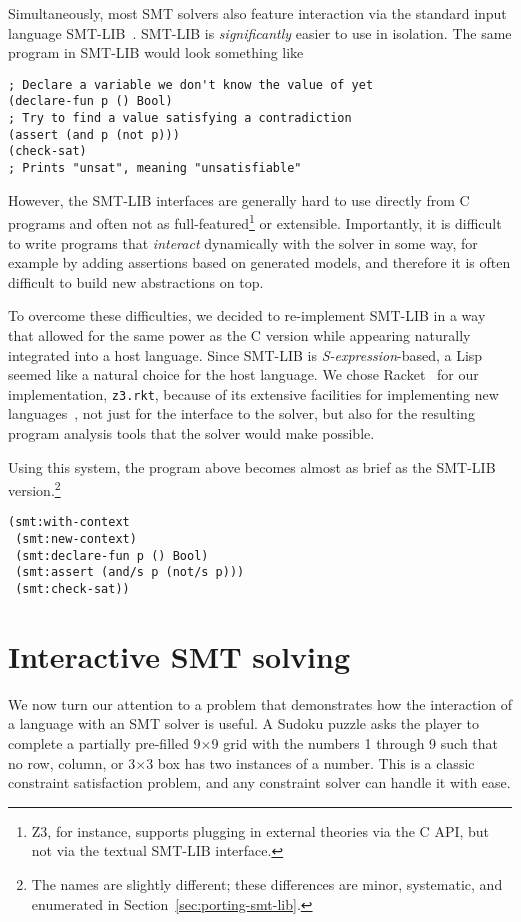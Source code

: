Simultaneously, most SMT solvers also feature interaction via the standard input
language SMT-LIB~\cite{smtlib2:10}. SMT-LIB is \textit{significantly} easier to
use in isolation. The same program in SMT-LIB would look something like

\begin{verbatim}
; Declare a variable we don't know the value of yet
(declare-fun p () Bool)
; Try to find a value satisfying a contradiction
(assert (and p (not p)))
(check-sat)
; Prints "unsat", meaning "unsatisfiable"
\end{verbatim}

However, the SMT-LIB interfaces are generally hard to use directly from C
programs and often not as full-featured\footnote{Z3, for instance, supports
  plugging in external theories via the C API, but not via the textual SMT-LIB
  interface.}  or extensible. Importantly, it is difficult to write programs
that \textit{interact} dynamically with the solver in some way, for example by
adding assertions based on generated models, and therefore it is often difficult
to build new abstractions on top.

To overcome these difficulties, we decided to re-implement SMT-LIB in a way
that allowed for the same power as the C version while appearing naturally
integrated into a host language. Since SMT-LIB is {\em S-expression}-based, a
Lisp seemed like a natural choice for the host language. We chose
Racket~\cite{racket} for our implementation, \texttt{z3.rkt}, because of its
extensive facilities for implementing new languages~\cite{Tobin-Hochstadt:11},
not just for the interface to the solver, but also for the resulting program
analysis tools that the solver would make possible.

Using this system, the program above becomes almost as brief as the SMT-LIB
version.\footnote{The names are slightly different; these differences are
minor, systematic, and enumerated in Section~\ref{sec:porting-smt-lib}.}

\begin{verbatim}
(smt:with-context
 (smt:new-context)
 (smt:declare-fun p () Bool)
 (smt:assert (and/s p (not/s p)))
 (smt:check-sat))
\end{verbatim}

\section{Interactive SMT solving}

We now turn our attention to a problem that demonstrates how the interaction of
a language with an SMT solver is useful. A Sudoku puzzle asks the player to
complete a partially pre-filled 9$\times$9 grid with the numbers 1 through 9
such that no row, column, or 3$\times$3 box has two instances of a number. This
is a classic constraint satisfaction problem, and any constraint solver can
handle it with ease.

